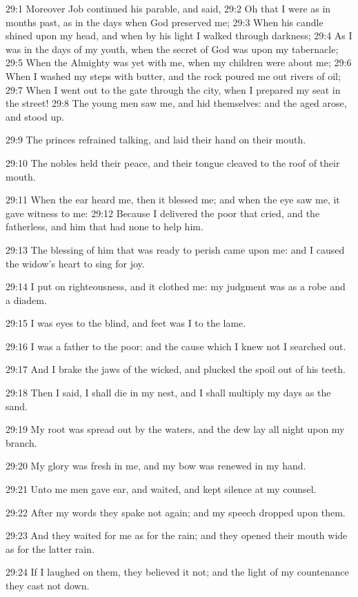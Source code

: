 29:1 Moreover Job continued his parable, and said, 29:2 Oh that I were as in months past, as in the days when God preserved me; 29:3 When his candle shined upon my head, and when by his light I walked through darkness; 29:4 As I was in the days of my youth, when the secret of God was upon my tabernacle; 29:5 When the Almighty was yet with me, when my children were about me; 29:6 When I washed my steps with butter, and the rock poured me out rivers of oil; 29:7 When I went out to the gate through the city, when I prepared my seat in the street!  29:8 The young men saw me, and hid themselves: and the aged arose, and stood up.

29:9 The princes refrained talking, and laid their hand on their mouth.

29:10 The nobles held their peace, and their tongue cleaved to the roof of their mouth.

29:11 When the ear heard me, then it blessed me; and when the eye saw me, it gave witness to me: 29:12 Because I delivered the poor that cried, and the fatherless, and him that had none to help him.

29:13 The blessing of him that was ready to perish came upon me: and I caused the widow's heart to sing for joy.

29:14 I put on righteousness, and it clothed me: my judgment was as a robe and a diadem.

29:15 I was eyes to the blind, and feet was I to the lame.

29:16 I was a father to the poor: and the cause which I knew not I searched out.

29:17 And I brake the jaws of the wicked, and plucked the spoil out of his teeth.

29:18 Then I said, I shall die in my nest, and I shall multiply my days as the sand.

29:19 My root was spread out by the waters, and the dew lay all night upon my branch.

29:20 My glory was fresh in me, and my bow was renewed in my hand.

29:21 Unto me men gave ear, and waited, and kept silence at my counsel.

29:22 After my words they spake not again; and my speech dropped upon them.

29:23 And they waited for me as for the rain; and they opened their mouth wide as for the latter rain.

29:24 If I laughed on them, they believed it not; and the light of my countenance they cast not down.

